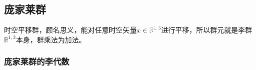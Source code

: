

\begin{issues}
\issueTODO
\end{issues}


\subsection{庞家莱群}
时空平移群，顾名思义，能对任意时空矢量$x\in \mathbb R^{1,3} $进行平移，所以群元就是李群$\mathbb R^{1,3}$本身，群乘法为加法。

\subsubsection{庞家莱群的李代数}